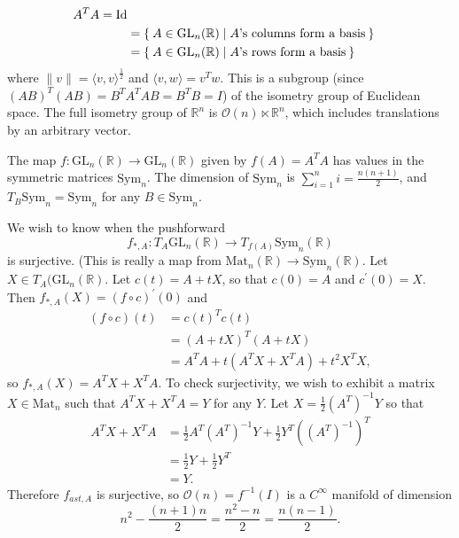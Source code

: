 \begin{xmpl}
\begin{enumerate}
{\begin{align*}
{            A^T A = \mathrm{Id}
         } \\
      &= \Set{ A \in \mathrm{GL}_n(\mathbb{R}) |
            \text{$A$'s columns form a basis}
         } \\
      &= \Set{ A \in \mathrm{GL}_n(\mathbb{R}) |
            \text{$A$'s rows form a basis}
         } \\
      \end{align*}
      where $\|v\| = \langle v, v \rangle^{\frac{1}{2}}$ and
      $\langle v, w \rangle = v^T w$. This is a subgroup (since
      $(AB)^T(AB) = B^T A^T A B = B^T B = I$) of the
      isometry group of Euclidean space.
      The full isometry group of $\mathbb{R}^n$ is
      $\mathcal{O}(n) \ltimes \mathbb{R}^n$, which includes
      translations by an arbitrary vector.

      The map $f: \mathrm{GL}_n(\mathbb{R}) \to
      \mathrm{GL}_n(\mathbb{R})$ given by $f(A) = A^T A$ has values in
      the symmetric matrices $\mathrm{Sym}_n$. The dimension of
      $\mathrm{Sym}_n$ is $\sum_{i=1}^n i = \frac{n(n+1)}{2}$, and
      $T_B \mathrm{Sym}_n = \mathrm{Sym}_n$ for any $B \in
      \mathrm{Sym}_n$.

      We wish to know when the pushforward
      $$
        f_{\ast, A} :
            T_A \mathrm{GL}_n(\mathbb{R})
        \to T_{f(A)} \mathrm{Sym}_n(\mathbb{R})
      $$
      is surjective. (This is really a map from
      $\mathrm{Mat}_n(\mathbb{R}) \to \mathrm{Sym}_n(\mathbb{R})$.
      Let $X \in T_A(\mathrm{GL}_n(\mathbb{R})$. Let
      $c(t) = A + tX$, so that $c(0) = A$ and $c^\prime(0) = X$. Then
      $f_{\ast, A}(X) = (f \circ c)^\prime(0)$ and
      \begin{align*}
         (f \circ c)(t)
      &= c(t)^T c(t) \\
      &= (A + tX)^T(A + tX) \\
      &= A^TA + t(A^T X + X^T A) + t^2 X^T X,
      \end{align*}
      so $f_{\ast, A}(X) = A^T X + X^T A$. To check surjectivity, we
      wish to exhibit a matrix $X \in \mathrm{Mat}_n$ such that
      $A^T X + X^T A = Y$ for any $Y$. Let
      $X = \frac{1}{2} (A^T)^{-1} Y$ so that
      \begin{align*}
         A^T X + X^T A
      &= \frac{1}{2}
           A^T (A^T)^{-1} Y
       + \frac{1}{2}
           Y^T((A^T)^{-1})^T \\
      &= \frac{1}{2} Y + \frac{1}{2} Y^T \\
      &= Y.
      \end{align*}
      Therefore $f_{ast, A}$ is surjective, so
      $\mathcal{O}(n) = f^{-1}(I)$ is a $C^\infty$ manifold of
      dimension
      $$
        n^2 - \frac{(n+1)n}{2}
      = \frac{n^2 - n}{2}
      = \frac{n(n-1)}{2}.
      $$

}
\end{enumerate}
\end{xmpl}

